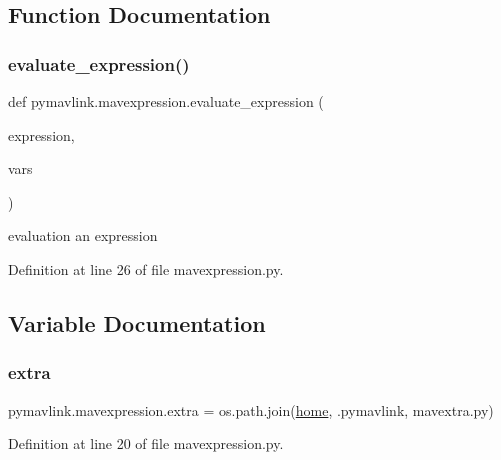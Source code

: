 \subsection{Function Documentation}
\mbox{\label{namespacepymavlink_1_1mavexpression_a8fee43c3020a15e908bbd7c6bce1e7ca}} 
\subsubsection{\texorpdfstring{evaluate\_expression()}{evaluate\_expression()}}
{\footnotesize\ttfamily def pymavlink.\+mavexpression.\+evaluate\+\_\+expression (\begin{DoxyParamCaption}\item[{}]{expression,  }\item[{}]{vars }\end{DoxyParamCaption})}

\begin{DoxyVerb}evaluation an expression\end{DoxyVerb}
 

Definition at line 26 of file mavexpression.\+py.



\subsection{Variable Documentation}
\mbox{\label{namespacepymavlink_1_1mavexpression_a1a68cb085c05aa0acd7c862299f8ea74}} 
\subsubsection{\texorpdfstring{extra}{extra}}
{\footnotesize\ttfamily pymavlink.\+mavexpression.\+extra = os.\+path.\+join(\mbox{\hyperlink{namespacepymavlink_1_1mavexpression_afc944dcbe25c09a86ea53d042ce147ad}{home}}, \textquotesingle{}.pymavlink\textquotesingle{}, \textquotesingle{}mavextra.\+py\textquotesingle{})}



Definition at line 20 of file mavexpression.\+py.


